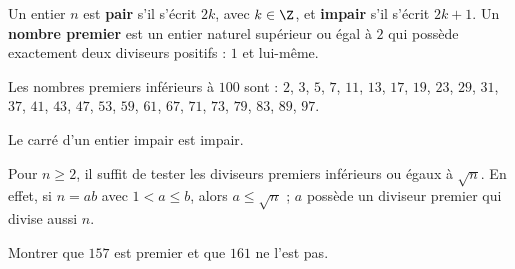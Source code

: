 \begin{keypoint}[Définitions]
Un entier $n$ est \textbf{pair} s'il s'écrit $2k$, avec $k\in\Z$, et \textbf{impair} s'il s'écrit $2k+1$.
Un \textbf{nombre premier} est un entier naturel supérieur ou égal à $2$ qui possède exactement deux diviseurs positifs : $1$ et lui-même.
\end{keypoint}
Les nombres premiers inférieurs à $100$ sont : $2$, $3$, $5$, $7$, $11$, $13$, $17$, $19$, $23$, $29$, $31$, $37$, $41$, $43$, $47$, $53$, $59$, $61$, $67$, $71$, $73$, $79$, $83$, $89$, $97$.
\begin{keypoint}
Le carré d'un entier impair est impair.
\end{keypoint}
\begin{method}
Pour $n\geq2$, il suffit de tester les diviseurs premiers inférieurs ou égaux à $\sqrt n$. En effet, si $n=ab$ avec $1<a\leq b$, alors $a\leq\sqrt n$ ; $a$ possède un diviseur premier qui divise aussi $n$.
\end{method}
\begin{example}Montrer que $157$ est premier et que $161$ ne l'est pas.\end{example}

